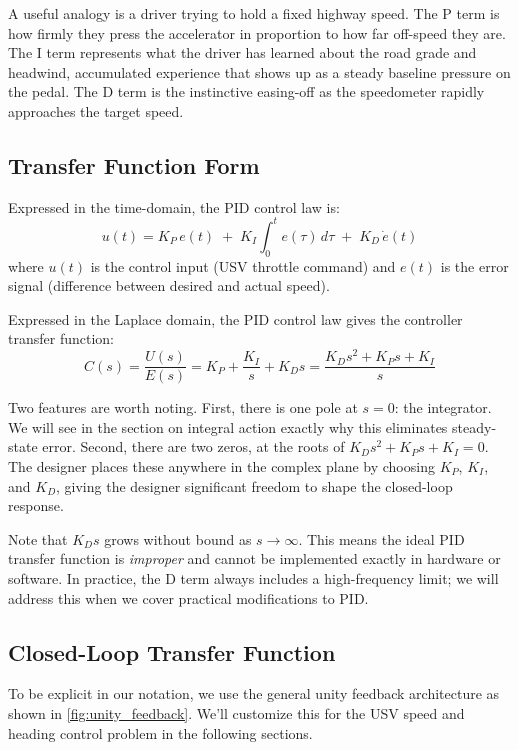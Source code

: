 \documentclass[12pt]{article}
\begin{document}
A useful analogy is a driver trying to hold a fixed highway speed.  The P term
is how firmly they press the accelerator in proportion to how far off-speed they are.
The I term represents what the driver has learned about the road grade and
headwind, accumulated experience that shows up as a steady baseline pressure
on the pedal.  The D term is the instinctive easing-off as the speedometer rapidly approaches the target speed. 

\subsection{Transfer Function Form}

Expressed in the time-domain, the PID control law is:
\begin{equation}
  u(t) = K_P\, e(t) \;+\; K_I \int_0^t e(\tau)\,d\tau \;+\; K_D\, \dot{e}(t)
  \label{eq:pid_time}
\end{equation}
where $u(t)$ is the control input (USV throttle command) and $e(t)$ is the error signal (difference between desired and actual speed).

Expressed in the Laplace domain, the PID control law gives the controller transfer function:
\begin{equation}
  C(s) = \frac{U(s)}{E(s)} = K_P + \frac{K_I}{s} + K_D s = \frac{K_D s^2 + K_P s + K_I}{s}
  \label{eq:pid_tf}
\end{equation}

Two features are worth noting.  First, there is one pole at $s = 0$: the
integrator.  We will see in the section on integral action exactly why this eliminates
steady-state error.  Second, there are two zeros, at the roots of
$K_D s^2 + K_P s + K_I = 0$.  The designer places these anywhere in the
complex plane by choosing $K_P$, $K_I$, and $K_D$, giving the designer significant freedom to
shape the closed-loop response.

Note that $K_D s$ grows without bound as $s \to \infty$.  This means the ideal
PID transfer function is \emph{improper} and cannot be implemented exactly in
hardware or software.  In practice, the D term always includes a high-frequency
limit; we will address this when we cover practical modifications to PID.

\subsection{Closed-Loop Transfer Function}

To be explicit in our notation, we use the general unity feedback architecture as shown in \cref{fig:unity_feedback}.  We'll customize this for the USV speed and heading control problem in the following sections.
\end{document}
